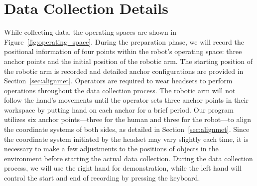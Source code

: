 

\section{Data Collection Details}
\label{sec:detail_data_collection}

While collecting data, the operating spaces are shown in Figure~\ref{fig:operating_space}. 
During the preparation phase, we will record the positional information of four points within the robot's operating space: three anchor points and the initial position of the robotic arm. The starting position of the robotic arm is recorded and detailed anchor configurations are provided in Section~\ref{sec:alignmet}. Operators are required to wear headsets to perform operations throughout the data collection process. The robotic arm will not follow the hand's movements until the operator sets three anchor points in their workspace by putting hand on each anchor for a brief period. Our program utilizes six anchor points—three for the human and three for the robot—to align the coordinate systems of both sides, as detailed in Section~\ref{sec:alignmet}. Since the coordinate system initiated by the headset may vary slightly each time, it is necessary to make a few adjustments to the positions of objects in the environment before starting the actual data collection. 
During the data collection process, we will use the right hand for demonstration, while the left hand will control the start and end of recording by pressing the keyboard.
